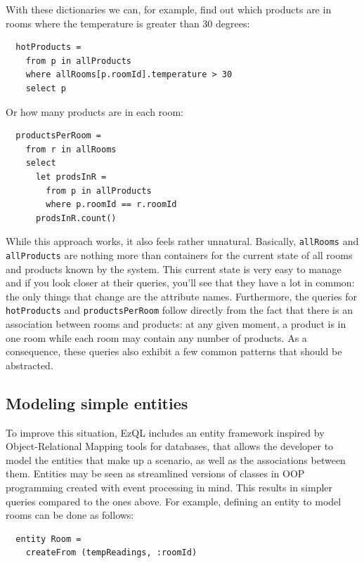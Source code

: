 With these dictionaries we can, for example, find out which products
are in rooms where the temperature is greater than 30 degrees:

\pagebreak
\begin{lstlisting}
  hotProducts =
    from p in allProducts
    where allRooms[p.roomId].temperature > 30
    select p
\end{lstlisting}

Or how many products are in each room:

\begin{lstlisting}
  productsPerRoom =
    from r in allRooms
    select
      let prodsInR =
        from p in allProducts
        where p.roomId == r.roomId
      prodsInR.count()
\end{lstlisting}

While this approach works, it also feels rather unnatural. Basically,
\verb=allRooms= and \verb=allProducts= are nothing more than
containers for the current state of all rooms and products known by
the system. This current state is very easy to manage and if you look
closer at their queries, you'll see that they have a lot in common:
the only things that change are the attribute names. Furthermore, the
queries for \verb=hotProducts= and \verb=productsPerRoom= follow
directly from the fact that there is an association between rooms and
products: at any given moment, a product is in one room while each
room may contain any number of products. As a consequence, these
queries also exhibit a few common patterns that should be abstracted.

\subsection{Modeling simple entities}

To improve this situation, EzQL includes an entity framework inspired
by Object-Relational Mapping tools for databases, that allows the
developer to model the entities that make up a scenario, as well as
the associations between them. Entities may be seen as streamlined
versions of classes in OOP programming created with event processing
in mind. This results in simpler queries compared to the ones
above. For example, defining an entity to model rooms can be done as
follows:

\begin{lstlisting}
  entity Room =
    createFrom (tempReadings, :roomId)
\end{lstlisting}

